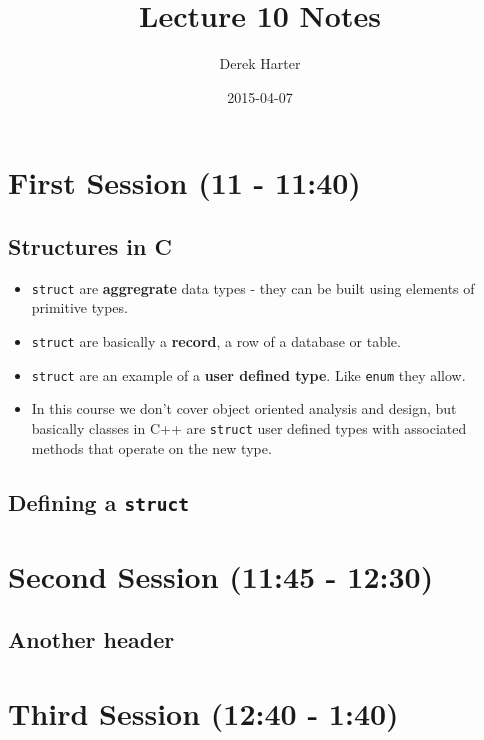 \documentclass[11pt]{article}
\title{Lecture 10 Notes}
\author{Derek Harter}
\date{2015-04-07}
\begin{document}
\maketitle


\section{First Session (11 - 11:40)}
\label{sec-1}
\subsection{Structures in C}
\label{sec-1-1}


\begin{itemize}
\item \verb~struct~ are \textbf{aggregrate} data types - they can be built using
  elements of primitive types.
\item \verb~struct~ are basically a \textbf{record}, a row of a database or table.
\item \verb~struct~ are an example of a \textbf{user defined type}.  Like \verb~enum~ they
  allow.
\item In this course we don't cover object oriented analysis and design,
  but basically classes in C++ are \verb~struct~ user defined types with
  associated methods that operate on the new type.
\end{itemize}
\subsection{Defining a \verb~struct~}
\label{sec-1-2}
\section{Second Session (11:45 - 12:30)}
\label{sec-2}
\subsection{Another header}
\label{sec-2-1}
\section{Third Session (12:40 - 1:40)}
\label{sec-3}
\end{document}
